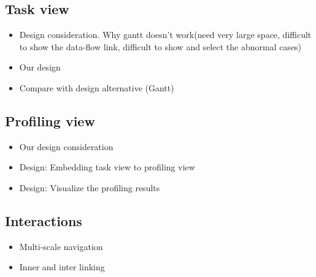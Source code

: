 \subsection{Task view}
\begin{itemize}
    \item Design consideration. Why gantt doesn't work(need very large space, difficult to show the data-flow link, difficult to show and select the abnormal cases)
    \item Our design
    \item Compare with design alternative (Gantt)
\end{itemize}


\subsection{Profiling view}
\begin{itemize}
    \item Our design consideration
    \item Design: Embedding task view to profiling view
    \item Design: Visualize the profiling results
\end{itemize}

\subsection{Interactions}
\begin{itemize}
    \item Multi-scale navigation
    \item Inner and inter linking
\end{itemize}
